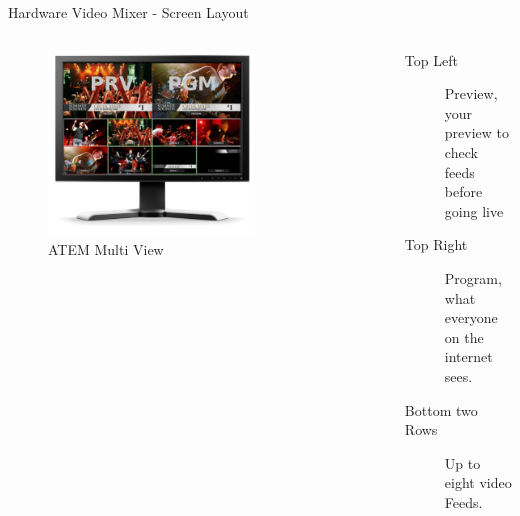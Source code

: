 \documentclass[aspectratio=169]{beamer}
\begin{document}
\begin{frame}{Hardware Video Mixer - Screen Layout}
	\begin{columns}[T,onlytextwidth]
	\begin{figure} 
		\centering
		\includegraphics[width=0.7\textwidth]{images/atem-multiview.png}
		\caption{ATEM Multi View}
		\label{fig:atem2}
	\end{figure}

	\begin{description}
		\item[Top Left] Preview, your preview to check feeds before going live 
		\item[Top Right] Program, what everyone on the internet sees.
		\item[Bottom two Rows] Up to eight video Feeds.
     \end{description}
	\end{columns}
\end{frame}
\end{document}
